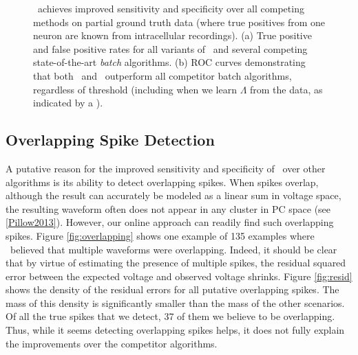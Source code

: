 \begin{center}
\begin{figure}
\begin{subfigure}[b]{.49\textwidth}
\caption{}
\label{fig:roc}
\end{subfigure}
\caption{\smug\ achieves improved sensitivity and specificity over all competing methods on partial ground truth data (where true positives from one neuron are known from intracellular recordings).  
(a) True positive and false positive rates for all variants of \smug\ and several competing state-of-the-art \emph{batch} algorithms.  
(b) ROC curves demonstrating that both \smug\ and \smug\ outperform all competitor batch algorithms, regardless of threshold (including when we learn $\Lambda$ from the data, as indicated by a \jovo{*}).
}
\end{figure}
\end{center}



\subsection{Overlapping Spike Detection}



A putative reason for the improved sensitivity and specificity of \smug\ over other algorithms is its ability to detect overlapping spikes.   When spikes overlap, although the result can accurately be modeled as a linear sum in voltage space, the resulting waveform often does not appear in any cluster in PC space (see \ref{Pillow2013}).  However, our online approach can readily find such overlapping spikes.  Figure \ref{fig:overlapping} shows one example of 135 examples where \smug\ believed that multiple waveforms were overlapping.  Indeed, it should be clear that by virtue of estimating the presence of multiple spikes, the residual squared error between the expected voltage and observed voltage shrinks.  Figure \ref{fig:resid} shows the density of the residual errors for all putative overlapping spikes.  The mass of this density is significantly smaller than the mass of the other scenarios.  Of all the true spikes that we detect, 37 of them we believe to be overlapping.  Thus, while it seems detecting overlapping spikes helps, it does not fully explain the improvements over the competitor algorithms.


